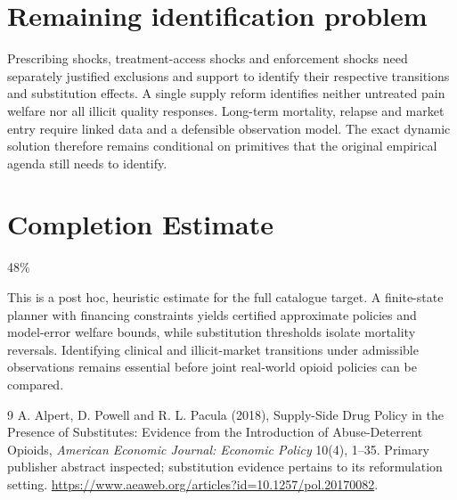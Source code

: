 \documentclass[11pt]{article}
\begin{document}
\section*{Remaining identification problem}
Prescribing shocks, treatment-access shocks and enforcement shocks need separately justified exclusions and support to identify their respective transitions and substitution effects. A single supply reform identifies neither untreated pain welfare nor all illicit quality responses. Long-term mortality, relapse and market entry require linked data and a defensible observation model. The exact dynamic solution therefore remains conditional on primitives that the original empirical agenda still needs to identify.

\section{Completion Estimate}
48\%

This is a post hoc, heuristic estimate for the full catalogue target.
A finite-state planner with financing constraints yields certified approximate policies and model-error welfare bounds, while substitution thresholds isolate mortality reversals. Identifying clinical and illicit-market transitions under admissible observations remains essential before joint real-world opioid policies can be compared.

\begin{thebibliography}{9}
 A. Alpert, D. Powell and R. L. Pacula (2018), Supply-Side Drug Policy in the Presence of Substitutes: Evidence from the Introduction of Abuse-Deterrent Opioids, \emph{American Economic Journal: Economic Policy} 10(4), 1--35. Primary publisher abstract inspected; substitution evidence pertains to its reformulation setting. \url{https://www.aeaweb.org/articles?id=10.1257/pol.20170082}.
\end{thebibliography}
\end{document}
